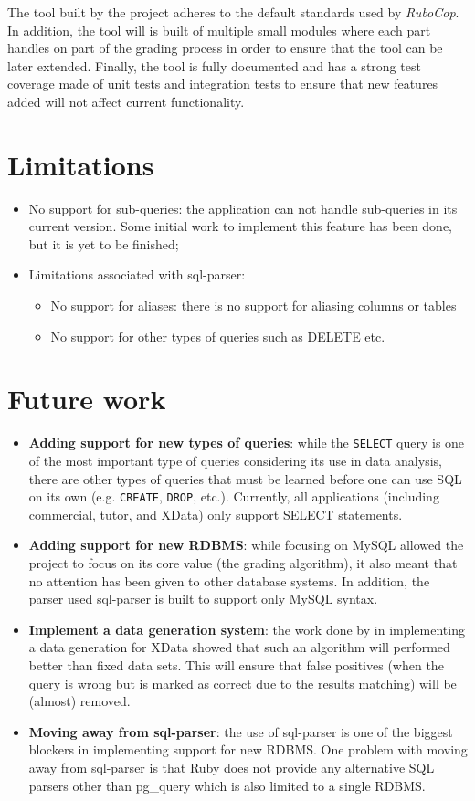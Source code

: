 The tool built by the project adheres to the default standards used by \textit{RuboCop}. In addition, the tool will is built of multiple small modules where each part handles on part of the grading process in order to ensure that the tool can be later extended. Finally, the tool is fully documented and has a strong test coverage made of unit tests and integration tests to ensure that new features added will not affect current functionality.

\section{Limitations}
\begin{itemize}
    \item No support for sub-queries: the application can not handle sub-queries in its current version. Some initial work to implement this feature has been done, but it is yet to be finished;
    \item Limitations associated with sql-parser:
    \begin{itemize}
        \item No support for aliases: there is no support for aliasing columns or tables
        \item No support for other types of queries such as DELETE etc.
    \end{itemize}
\end{itemize}


\section{Future work}
\begin{itemize}
    \item \textbf{Adding support for new types of queries}: while the \texttt{SELECT} query is one of the most important type of queries considering its use in data analysis, there are other types of queries that must be learned before one can use SQL on its own (e.g. \texttt{CREATE}, \texttt{DROP}, etc.). Currently, all applications (including commercial, tutor, and XData) only support SELECT statements.
    \item \textbf{Adding support for new RDBMS}: while focusing on MySQL allowed the project to focus on its core value (the grading algorithm), it also meant that no attention has been given to other database systems. In addition, the parser used sql-parser is built to support only MySQL syntax.
    \item \textbf{Implement a data generation system}: the work done by \citet{lit:xdata_d} in implementing a data generation for XData showed that such an algorithm will performed better than fixed data sets. This will ensure that false positives (when the query is wrong but is marked as correct due to the results matching) will be (almost) removed.
    \item \textbf{Moving away from sql-parser}: the use of sql-parser is one of the biggest blockers in implementing support for new RDBMS. One problem with moving away from sql-parser is that Ruby does not provide any alternative SQL parsers other than pg\_query which is also limited to a single RDBMS.
\end{itemize}